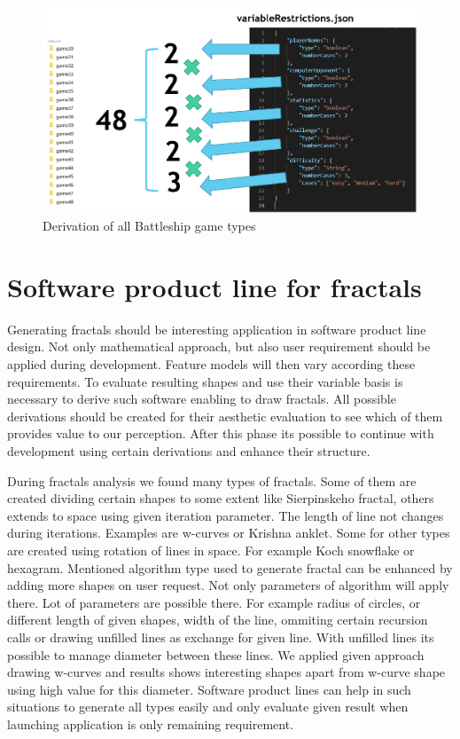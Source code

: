 \documentclass[11pt,slovak,a4paper,twoside]{article}
\begin{document}
\begin{figure}[H]  %
					\begin{center}
									\includegraphics[width=\linewidth]{fig/allCases.png}
									\caption{Derivation of all Battleship game types}
									\label{derivationBattleshipTypes}
					\end{center}
\end{figure}


\section{Software product line for fractals} \label{fractalProductLine}

Generating fractals should be interesting application in software product line design. Not only mathematical approach, but also user requirement should be applied during development. Feature models will then vary according these requirements. To evaluate resulting shapes and use their variable basis is necessary to derive such software enabling to draw fractals. All possible derivations should be created for their aesthetic evaluation to see which of them provides value to our perception. After this phase its possible to continue with development using certain derivations and enhance their structure.

During fractals analysis we found many types of fractals. Some of them are created dividing certain shapes to some extent like Sierpinskeho fractal, others extends to space using given iteration parameter. The length of line not changes during iterations. Examples are w-curves or Krishna anklet. Some for other types are created using rotation of lines in space. For example Koch snowflake or hexagram. Mentioned algorithm type used to generate fractal can be enhanced by adding more shapes on user request. Not only parameters of algorithm will apply there. Lot of parameters are possible there. For example radius of circles, or different length of given shapes, width of the line, ommiting certain recursion calls or drawing unfilled lines as exchange for given line. With unfilled lines its possible to manage diameter between these lines. We applied given approach drawing w-curves and results shows interesting shapes apart from w-curve shape using high value for this diameter. Software product lines can help in such situations to generate all types easily and only evaluate given result when launching application is only remaining requirement.
\end{document}
